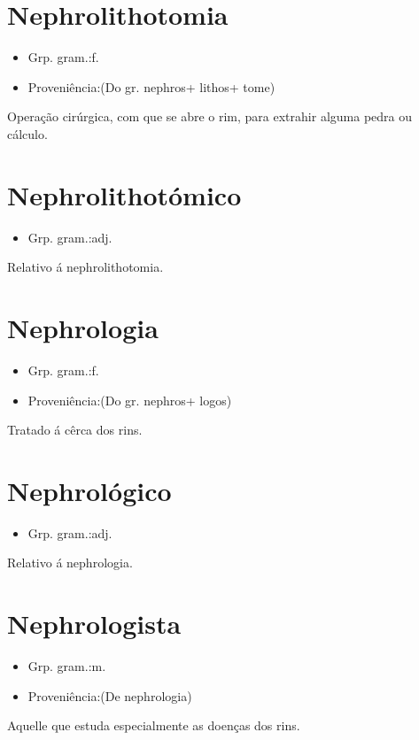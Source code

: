 \section{Nephrolithotomia}
\begin{itemize}
\item {Grp. gram.:f.}
\end{itemize}
\begin{itemize}
\item {Proveniência:(Do gr. \textunderscore nephros\textunderscore  + \textunderscore lithos\textunderscore  + \textunderscore tome\textunderscore )}
\end{itemize}
Operação cirúrgica, com que se abre o rim, para extrahir alguma pedra ou cálculo.
\section{Nephrolithotómico}
\begin{itemize}
\item {Grp. gram.:adj.}
\end{itemize}
Relativo á nephrolithotomia.
\section{Nephrologia}
\begin{itemize}
\item {Grp. gram.:f.}
\end{itemize}
\begin{itemize}
\item {Proveniência:(Do gr. \textunderscore nephros\textunderscore  + \textunderscore logos\textunderscore )}
\end{itemize}
Tratado á cêrca dos rins.
\section{Nephrológico}
\begin{itemize}
\item {Grp. gram.:adj.}
\end{itemize}
Relativo á nephrologia.
\section{Nephrologista}
\begin{itemize}
\item {Grp. gram.:m.}
\end{itemize}
\begin{itemize}
\item {Proveniência:(De \textunderscore nephrologia\textunderscore )}
\end{itemize}
Aquelle que estuda especialmente as doenças dos rins.
